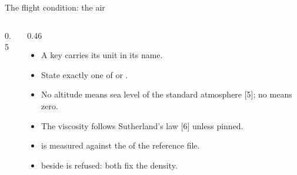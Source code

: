 \begin{frame}{The flight condition: the air}
\begin{columns}[T]
\begin{column}{0.5\textwidth}
\end{column}
\begin{column}{0.46\textwidth}
\begin{itemize}\small
  \item A key carries its unit in its name.
  \item State exactly one of  or .
  \item No altitude means sea level of the standard atmosphere [5]; no
         means zero.
  \item The viscosity follows Sutherland's law [6] unless pinned.
  \item {} is measured against the  of the reference
        file.
  \item {} beside  is refused: both fix the density.
\end{itemize}
\end{column}
\end{columns}
\end{frame}


